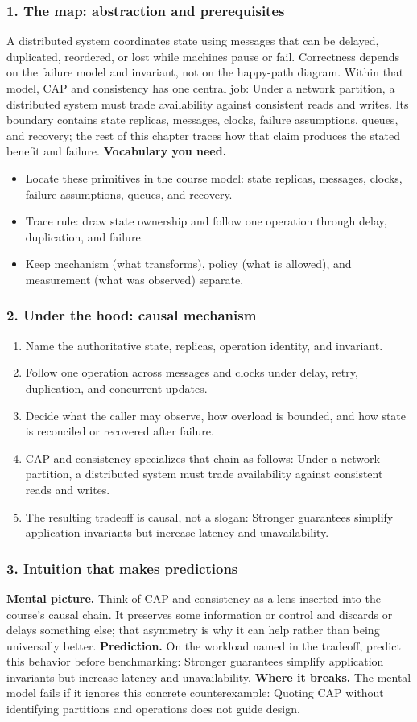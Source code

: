 \subsubsection*{1. The map: abstraction and prerequisites}
A distributed system coordinates state using messages that can be delayed, duplicated, reordered, or lost while machines pause or fail. Correctness depends on the failure model and invariant, not on the happy-path diagram.
Within that model, CAP and consistency has one central job: Under a network partition, a distributed system must trade availability against consistent reads and writes. Its boundary contains state replicas, messages, clocks, failure assumptions, queues, and recovery; the rest of this chapter traces how that claim produces the stated benefit and failure.
\textbf{Vocabulary you need.}\begin{itemize}
\item Locate these primitives in the course model: state replicas, messages, clocks, failure assumptions, queues, and recovery.
\item Trace rule: draw state ownership and follow one operation through delay, duplication, and failure.
\item Keep mechanism (what transforms), policy (what is allowed), and measurement (what was observed) separate.
\end{itemize}
\subsubsection*{2. Under the hood: causal mechanism}\begin{enumerate}
\item Name the authoritative state, replicas, operation identity, and invariant.
\item Follow one operation across messages and clocks under delay, retry, duplication, and concurrent updates.
\item Decide what the caller may observe, how overload is bounded, and how state is reconciled or recovered after failure.
\item CAP and consistency specializes that chain as follows: Under a network partition, a distributed system must trade availability against consistent reads and writes.
\item The resulting tradeoff is causal, not a slogan: Stronger guarantees simplify application invariants but increase latency and unavailability.
\end{enumerate}
\subsubsection*{3. Intuition that makes predictions}
\textbf{Mental picture.} Think of CAP and consistency as a lens inserted into the course's causal chain. It preserves some information or control and discards or delays something else; that asymmetry is why it can help rather than being universally better.
\textbf{Prediction.} On the workload named in the tradeoff, predict this behavior before benchmarking: Stronger guarantees simplify application invariants but increase latency and unavailability.
\textbf{Where it breaks.} The mental model fails if it ignores this concrete counterexample: Quoting CAP without identifying partitions and operations does not guide design.
